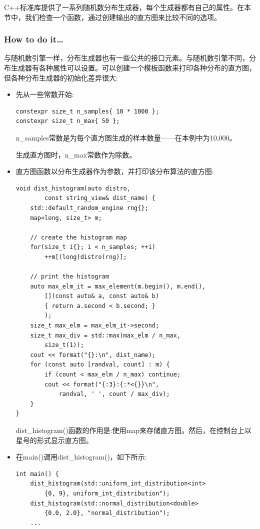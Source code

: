 
C++标准库提供了一系列随机数分布生成器，每个生成器都有自己的属性。在本节中，我们检查一个函数，通过创建输出的直方图来比较不同的选项。

\subsubsection{How to do it…}

与随机数引擎一样，分布生成器也有一些公共的接口元素。与随机数引擎不同，分布生成器有各种属性可以设置。可以创建一个模板函数来打印各种分布的直方图，但各种分布生成器的初始化差异很大:

\begin{itemize}
\item 
先从一些常数开始:

\begin{lstlisting}[style=styleCXX]
constexpr size_t n_samples{ 10 * 1000 };
constexpr size_t n_max{ 50 };
\end{lstlisting}

n\_samples常数是为每个直方图生成的样本数量——在本例中为10,000。

生成直方图时，n\_max常数作为除数。

\item 
直方图函数以分布生成器作为参数，并打印该分布算法的直方图:

\begin{lstlisting}[style=styleCXX]
void dist_histogram(auto distro,
		const string_view& dist_name) {
	std::default_random_engine rng{};
	map<long, size_t> m;
	
	// create the histogram map
	for(size_t i{}; i < n_samples; ++i)
		++m[(long)distro(rng)];
	
	// print the histogram
	auto max_elm_it = max_element(m.begin(), m.end(),
		[](const auto& a, const auto& b)
		{ return a.second < b.second; }
		);
	size_t max_elm = max_elm_it->second;
	size_t max_div = std::max(max_elm / n_max,
		size_t(1));
	cout << format("{}:\n", dist_name);
	for (const auto [randval, count] : m) {
		if (count < max_elm / n_max) continue;
		cout << format("{:3}:{:*<{}}\n",
			randval, ' ', count / max_div);
	}
}
\end{lstlisting}

dist\_histogram()函数的作用是:使用map来存储直方图。然后，在控制台上以星号的形式显示直方图。

\item 
在main()调用dist\_histogram()，如下所示:

\begin{lstlisting}[style=styleCXX]
int main() {
	dist_histogram(std::uniform_int_distribution<int>
		{0, 9}, uniform_int_distribution");
	dist_histogram(std::normal_distribution<double>
		{0.0, 2.0}, "normal_distribution");
	...
\end{lstlisting}


\end{itemize}
